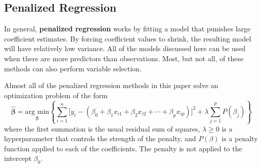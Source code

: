 \documentclass{article}
\newcommand{\argmin}[2]{\underset{#1}{\text{arg min}}\left\{#2\right\}}
\begin{document}
	\subsection{Penalized Regression}
	
	In general, \textbf{penalized regression} works by fitting a model that punishes large coefficient estimates. By forcing coefficient values to shrink, the resulting model will have relatively low variance. All of the models discussed here can be used when there are more predictors than observations. Most, but not all, of these methods can also perform variable selection.
	
	Almost all of the penalized regression methods in this paper solve an optimization problem of the form
	\begin{equation}\label{eqn:penalized-regression-lambda}
		\hat{\bm{\beta}}=\argmin{\bm{\beta}}{\sum\limits_{i = 1}^n \Big[y_i - (\beta_0 + \beta_1 x_{i1} + \beta_2 x_{i2} + \cdots + \beta_p x_{ip})\Big]^2 + \lambda\sum\limits_{j = 1}^p P(\beta_j)}
	\end{equation}
	where the first summation is the usual residual sum of squares, $\lambda\geq 0$ is a hyperparameter that controls the strength of the penalty, and $P(\beta)$ is a penalty function applied to each of the coefficients. The penalty is not applied to the intercept $\beta_0$.

	
\end{document}
